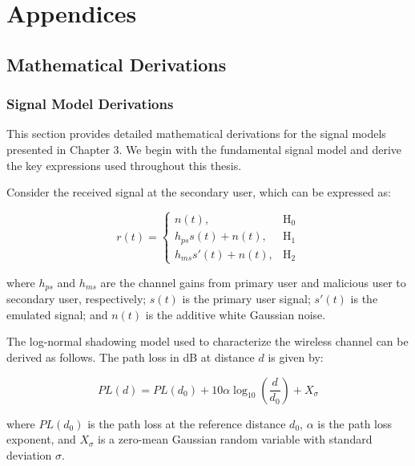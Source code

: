 
\chapter{Appendices}

\section{\texorpdfstring{\large\textbf{Mathematical Derivations}}{Mathematical Derivations}}

\subsection{Signal Model Derivations}
\label{app:signal_derivations}

This section provides detailed mathematical derivations for the signal models presented in Chapter 3. We begin with the fundamental signal model and derive the key expressions used throughout this thesis.

Consider the received signal at the secondary user, which can be expressed as:

\begin{equation}
r(t) = 
\begin{cases}
    n(t), & \text{H}_0 \\
    h_{ps}s(t) + n(t), & \text{H}_1 \\
    h_{ms}s'(t) + n(t), & \text{H}_2
\end{cases}
\end{equation}

where $h_{ps}$ and $h_{ms}$ are the channel gains from primary user and malicious user to secondary user, respectively; $s(t)$ is the primary user signal; $s'(t)$ is the emulated signal; and $n(t)$ is the additive white Gaussian noise.

The log-normal shadowing model used to characterize the wireless channel can be derived as follows. The path loss in dB at distance $d$ is given by:

\begin{equation}
    PL(d) = PL(d_0) + 10\alpha\log_{10}\left(\frac{d}{d_0}\right) + X_\sigma
\end{equation}

where $PL(d_0)$ is the path loss at the reference distance $d_0$, $\alpha$ is the path loss exponent, and $X_\sigma$ is a zero-mean Gaussian random variable with standard deviation $\sigma$.

